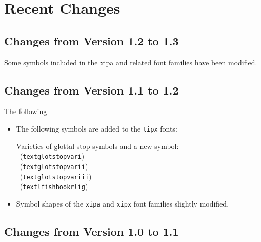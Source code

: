 %
%
%

\begingroup
\raggedbottom

\chapter{Recent Changes}

\section{Changes from Version 1.2 to 1.3}

Some symbols included in the xipa and related font families have been
modified. 

\section{Changes from Version 1.1 to 1.2}

The following 

\begin{itemize}
\item The following symbols are added to the \texttt{tipx} fonts:

  Varieties of glottal stop symbols and a new symbol:\\
  \textglotstopvari\ (\texttt{\tbs textglotstopvari})\\
  \textglotstopvarii\ (\texttt{\tbs textglotstopvarii})\\
  \textglotstopvariii\ (\texttt{\tbs textglotstopvariii})\\
  \textlfishhookrlig\ (\texttt{\tbs textlfishhookrlig})

\item Symbol shapes of the \texttt{xipa} and \texttt{xipx} font
  families slightly modified.
\end{itemize}

\section{Changes from Version 1.0 to 1.1}

